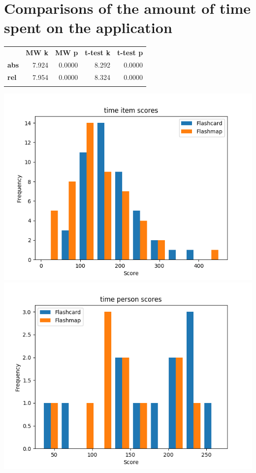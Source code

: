 \section{Comparisons of the amount of time spent on the application}

\begin{longtable}[c]{@{}lrrrr@{}}
\toprule\addlinespace
& \textbf{MW k} & \textbf{MW p} &
\textbf{t-test k} & \textbf{t-test p}
\\\addlinespace
\midrule
\textbf{abs} & 7.924 & 0.0000 & 8.292 & 0.0000
\\\addlinespace
\textbf{rel} & 7.954 & 0.0000 & 8.324 & 0.0000
\\\addlinespace
\bottomrule
\end{longtable}

\includegraphics{img/time_diff.png} \includegraphics{img/time_abil.png}
